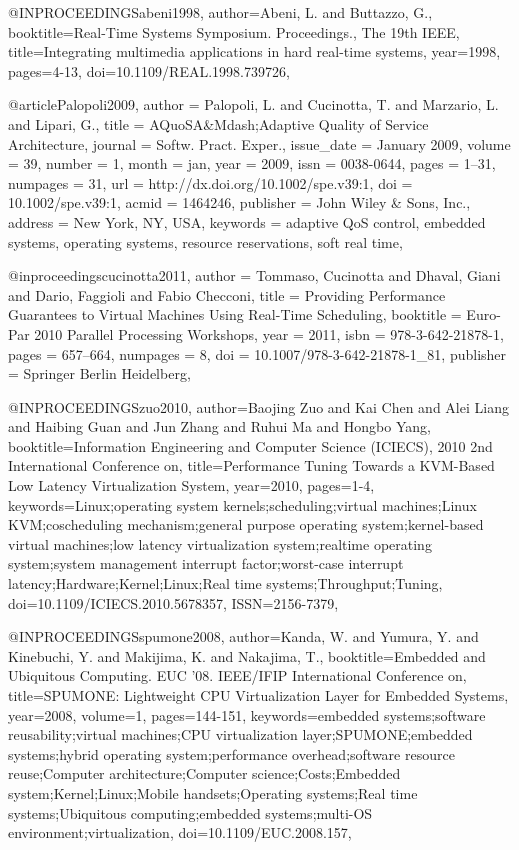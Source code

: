 @INPROCEEDINGS{abeni1998, 
author={Abeni, L. and Buttazzo, G.}, 
booktitle={Real-Time Systems Symposium. Proceedings., The 19th IEEE}, 
title={Integrating multimedia applications in hard real-time systems}, 
year={1998}, 
pages={4-13}, 
doi={10.1109/REAL.1998.739726},}

@article{Palopoli2009,
 author = {Palopoli, L. and Cucinotta, T. and Marzario, L. and Lipari, G.},
 title = {AQuoSA\&Mdash;Adaptive Quality of Service Architecture},
 journal = {Softw. Pract. Exper.},
 issue_date = {January 2009},
 volume = {39},
 number = {1},
 month = jan,
 year = {2009},
 issn = {0038-0644},
 pages = {1--31},
 numpages = {31},
 url = {http://dx.doi.org/10.1002/spe.v39:1},
 doi = {10.1002/spe.v39:1},
 acmid = {1464246},
 publisher = {John Wiley \& Sons, Inc.},
 address = {New York, NY, USA},
 keywords = {adaptive QoS control, embedded systems, operating systems, resource reservations, soft real time},
} 

@inproceedings{cucinotta2011,
 author = {Tommaso, Cucinotta and Dhaval, Giani and Dario, Faggioli and Fabio Checconi},
 title = {Providing Performance Guarantees to Virtual Machines Using Real-Time Scheduling},
 booktitle = {Euro-Par 2010 Parallel Processing Workshops},
 year = {2011},
 isbn = {978-3-642-21878-1},
 pages = {657--664},
 numpages = {8},
 doi = {10.1007/978-3-642-21878-1_81},
 publisher = {Springer Berlin Heidelberg},
} 

@INPROCEEDINGS{zuo2010, 
author={Baojing Zuo and Kai Chen and Alei Liang and Haibing Guan and Jun Zhang and Ruhui Ma and Hongbo Yang}, 
booktitle={Information Engineering and Computer Science (ICIECS), 2010 2nd International Conference on}, 
title={Performance Tuning Towards a KVM-Based Low Latency Virtualization System}, 
year={2010}, 
pages={1-4}, 
keywords={Linux;operating system kernels;scheduling;virtual machines;Linux KVM;coscheduling mechanism;general purpose operating system;kernel-based virtual machines;low latency virtualization system;realtime operating system;system management interrupt factor;worst-case interrupt latency;Hardware;Kernel;Linux;Real time systems;Throughput;Tuning}, 
doi={10.1109/ICIECS.2010.5678357}, 
ISSN={2156-7379},}

@INPROCEEDINGS{spumone2008, 
author={Kanda, W. and Yumura, Y. and Kinebuchi, Y. and Makijima, K. and Nakajima, T.}, 
booktitle={Embedded and Ubiquitous Computing. EUC '08. IEEE/IFIP International Conference on}, 
title={SPUMONE: Lightweight CPU Virtualization Layer for Embedded Systems}, 
year={2008}, 
volume={1}, 
pages={144-151}, 
keywords={embedded systems;software reusability;virtual machines;CPU virtualization layer;SPUMONE;embedded systems;hybrid operating system;performance overhead;software resource reuse;Computer architecture;Computer science;Costs;Embedded system;Kernel;Linux;Mobile handsets;Operating systems;Real time systems;Ubiquitous computing;embedded systems;multi-OS environment;virtualization}, 
doi={10.1109/EUC.2008.157},}

